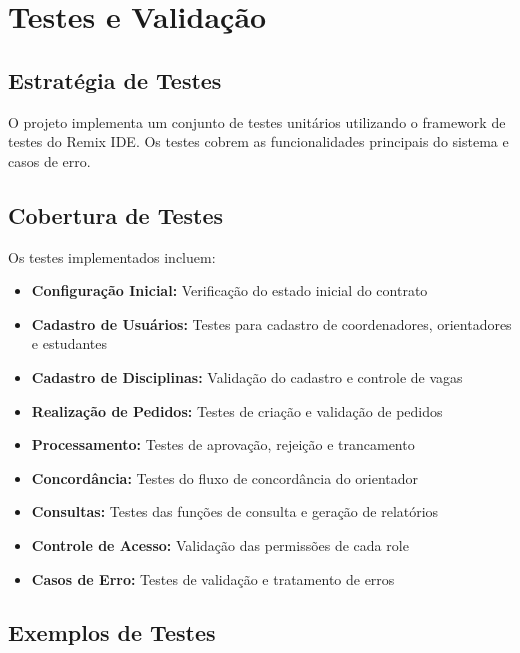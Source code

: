 \documentclass[12pt,a4paper]{article}
\begin{document}
\section{Testes e Validação}

\subsection{Estratégia de Testes}

O projeto implementa um conjunto de testes unitários utilizando o framework de testes do Remix IDE. Os testes cobrem as funcionalidades principais do sistema e casos de erro.

\subsection{Cobertura de Testes}

Os testes implementados incluem:

\begin{itemize}
    \item \textbf{Configuração Inicial:} Verificação do estado inicial do contrato
    \item \textbf{Cadastro de Usuários:} Testes para cadastro de coordenadores, orientadores e estudantes
    \item \textbf{Cadastro de Disciplinas:} Validação do cadastro e controle de vagas
    \item \textbf{Realização de Pedidos:} Testes de criação e validação de pedidos
    \item \textbf{Processamento:} Testes de aprovação, rejeição e trancamento
    \item \textbf{Concordância:} Testes do fluxo de concordância do orientador
    \item \textbf{Consultas:} Testes das funções de consulta e geração de relatórios
    \item \textbf{Controle de Acesso:} Validação das permissões de cada role
    \item \textbf{Casos de Erro:} Testes de validação e tratamento de erros
\end{itemize}

\subsection{Exemplos de Testes}
\end{document}
